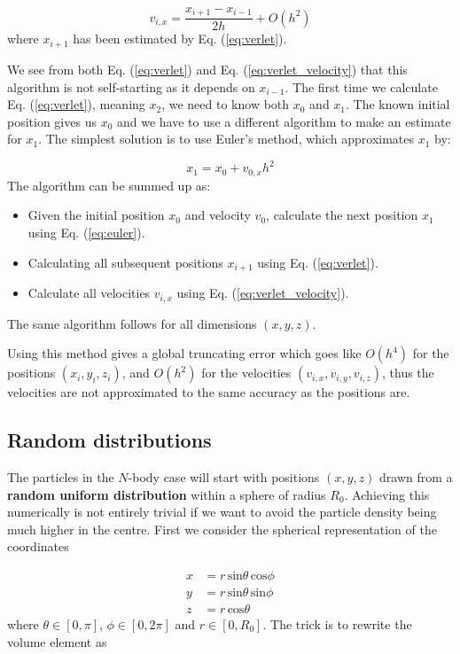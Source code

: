 \documentclass{article}
\begin{document}
\begin{multicols}{2}
\begin{equation}\label{eq:verlet_velocity}
	v_{i,x} = \frac{x_{i+1} - x_{i-1}}{2h} + O(h^2)
\end{equation}
where $x_{i+1}$ has been estimated by Eq. (\ref{eq:verlet}). 

We see from both Eq. (\ref{eq:verlet}) and Eq. (\ref{eq:verlet_velocity}) that this algorithm is not self-starting as it depends on $x_{i-1}$. The first time we calculate Eq. (\ref{eq:verlet}), meaning $x_2$, we need to know both $x_0$ and $x_1$. The known initial position gives us $x_0$ and we have to use a different algorithm to make an estimate for $x_1$. The simplest solution is to use Euler's method, which approximates $x_1$ by:

\begin{equation}\label{eq:euler}
	x_1 = x_0 + v_{0,x} h^2
\end{equation}
The algorithm can be summed up as:

\begin{itemize}
	\item Given the initial position $x_0$ and velocity $v_0$, calculate the next position $x_1$ using Eq. (\ref{eq:euler}).
	\item Calculating all subsequent positions $x_{i+1}$ using Eq. (\ref{eq:verlet}).
	\item Calculate all velocities $v_{i,x}$ using Eq. (\ref{eq:verlet_velocity}).
\end{itemize}
The same algorithm follows for all dimensions $(x,y,z)$.

Using this method gives a global truncating error which goes like $O(h^4)$ for the positions $(x_i,y_i,z_i)$, and $O(h^2)$ for the velocities $(v_{i,x},v_{i,y},v_{i,z})$, thus the velocities are not approximated to the same accuracy as the positions are. 


\subsection{Random distributions}
The particles in the $N$-body case will start with positions $(x,y,z)$ drawn from a \textbf{random uniform distribution} within a sphere of radius $R_0$. Achieving this numerically is not entirely trivial if we want to avoid the particle density being much higher in the centre. First we consider the spherical representation of the coordinates

\begin{equation}\label{eq:coord_transf}
\begin{aligned}
	x &= r \, \mathrm{sin}\theta \, \mathrm{cos}\phi \\
	y &= r \, \mathrm{sin}\theta \, \mathrm{sin}\phi \\
	z &= r \, \mathrm{cos}\theta
\end{aligned}
\end{equation}
where $\theta \in [0,\pi]$, $\phi \in [0,2\pi]$ and $r \in [0,R_0]$. The trick is to rewrite the volume element as


\end{multicols}
\end{document}
